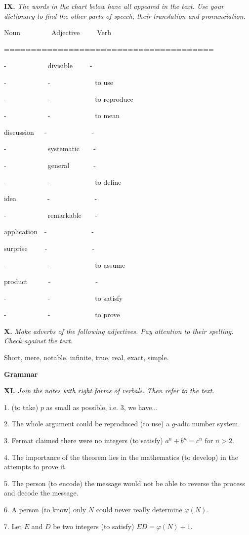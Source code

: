 \documentclass[a4paper]{article}
\newcommand{\ESect}[1]{\medskip\par{\large \textbf{#1}}\par}
\newcommand{\ETask}[2]{\medskip\par\textbf{#1.} \textit{#2}\par}
\newcommand{\ETypeWr}[1]{\par\begin{ttfamily}#1\end{ttfamily}\par}
\begin{document}
\ETask{IX}{The words in the chart below have all appeared in the text. Use your dictionary to find the other parts of speech,
their translation and pronunciation.}
\ETypeWr{
Noun~~~~~~~~~Adjective~~~~~Verb

=======================================

-~~~~~~~~~~~~divisible~~~~~-

-~~~~~~~~~~~~-~~~~~~~~~~~~~to use

-~~~~~~~~~~~~-~~~~~~~~~~~~~to reproduce

-~~~~~~~~~~~~-~~~~~~~~~~~~~to mean

discussion~~~-~~~~~~~~~~~~~-

-~~~~~~~~~~~~systematic~~~~-

-~~~~~~~~~~~~general~~~~~~~-

-~~~~~~~~~~~~-~~~~~~~~~~~~~to define

idea~~~~~~~~~-~~~~~~~~~~~~~-

-~~~~~~~~~~~~remarkable~~~~-

application~~-~~~~~~~~~~~~~-

surprise~~~~~-~~~~~~~~~~~~~-

-~~~~~~~~~~~~-~~~~~~~~~~~~~to assume

product~~~~~~-~~~~~~~~~~~~~-

-~~~~~~~~~~~~-~~~~~~~~~~~~~to satisfy

-~~~~~~~~~~~~-~~~~~~~~~~~~~to prove
}

\ETask{X}{Make adverbs of the following adjectives. Pay attention to their spelling. Check against the text.}
Short, mere, notable, infinite, true, real, exact, simple.

\ESect{Grammar}
\ETask{XI}{Join the notes with right forms of verbals. Then refer to the text.}

1. (to take) $p$ as small as possible, i.e. 3, we have...

2. The whole argument could be reproduced (to use) a $g$-adic number system.

3. Fermat claimed there were no integers (to satisfy) $a^n+b^n=c^n$ for $n>2$.

4. The importance of the theorem lies in the mathematics (to develop) in the attempts to prove it.

5. The person (to encode) the message would not be able to reverse the process and decode the message.

6. A person (to know) only $N$ could never really determine $\varphi(N)$.

7. Let $E$ and $D$ be two integers (to satisfy) $ED=\varphi(N)+1$.
\end{document}
